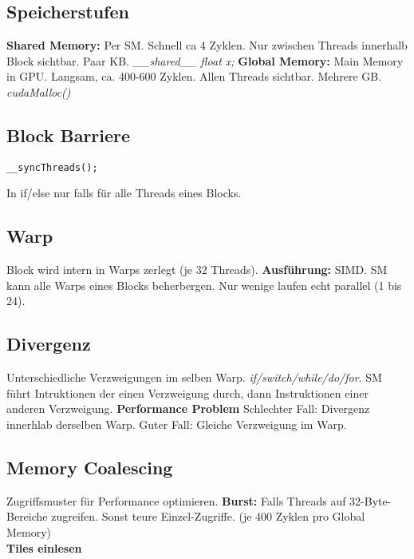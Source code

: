\subsection{Speicherstufen}
\textbf{Shared Memory:} Per SM.
Schnell ca 4 Zyklen.
Nur zwischen Threads innerhalb Block sichtbar.
Paar KB.
\textit{\_\_shared\_\_ float x;}
\textbf{Global Memory:}
Main Memory in GPU.
Langsam, ca. 400-600 Zyklen.
Allen Threads sichtbar.
Mehrere GB.
\textit{cudaMalloc()}

\subsection{Block Barriere}
\begin{lstlisting}
__syncThreads();
\end{lstlisting}
In if/else nur falls für alle Threads eines Blocks.

\subsection{Warp}
Block wird intern in Warps zerlegt (je 32 Threads).
\textbf{Ausführung:} SIMD.
SM kann alle Warps eines Blocks beherbergen. Nur wenige laufen echt parallel (1 bis 24).

\subsection{Divergenz}
Unterschiedliche Verzweigungen im selben Warp.
\textit{if/switch/while/do/for}.
SM führt Intruktionen der einen Verzweigung durch, dann Instruktionen einer anderen Verzweigung.
\textbf{Performance Problem}
Schlechter Fall: Divergenz innerhlab derselben Warp.
Guter Fall: Gleiche Verzweigung im Warp.

\subsection{Memory Coalescing}
Zugriffsmuster für Performance optimieren.
\textbf{Burst:}  Falls Threads auf 32-Byte-Bereiche zugreifen.
Sonst teure Einzel-Zugriffe. (je 400 Zyklen pro Global Memory)\\ 
\textbf{Tiles einlesen}